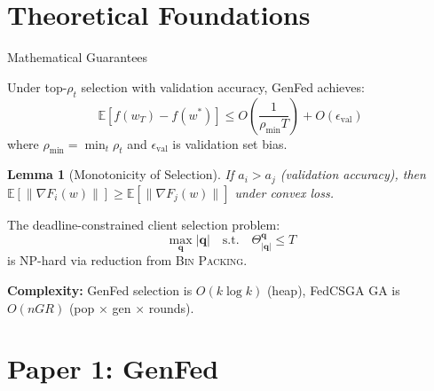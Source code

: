 \documentclass{beamer}
\newtheorem{lemma}{Lemma}
\begin{document}
\section{Theoretical Foundations}

\begin{frame}{Mathematical Guarantees}
\begin{theorem}
Under top-$\rho_t$ selection with validation accuracy, GenFed achieves:
$$\mathbb{E}[f(w_T) - f(w^*)] \leq O\left(\frac{1}{\rho_{\min} T}\right) + O(\epsilon_{\text{val}})$$
where $\rho_{\min} = \min_t \rho_t$ and $\epsilon_{\text{val}}$ is validation set bias.
\end{theorem}

\begin{lemma}[Monotonicity of Selection]
If $a_i > a_j$ (validation accuracy), then $\mathbb{E}[\|\nabla F_i(w)\|] \geq \mathbb{E}[\|\nabla F_j(w)\|]$ under convex loss.
\end{lemma}

\begin{theorem}
The deadline-constrained client selection problem:
$$\max_{\mathbf{q}} |\mathbf{q}| \quad \text{s.t.} \quad \Theta_{|\mathbf{q}|}^{\mathbf{q}} \leq T$$
is NP-hard via reduction from \textsc{Bin Packing}.
\end{theorem}

\textbf{Complexity:} GenFed selection is $O(k \log k)$ (heap), FedCSGA GA is $O(nGR)$ (pop × gen × rounds).
\end{frame}

\section{Paper 1: GenFed}
\end{document}
